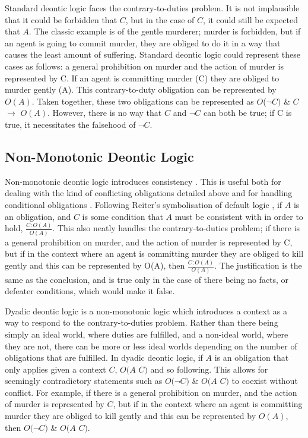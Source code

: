 \documentclass{l4proj}
\begin{document}
Standard deontic logic faces the contrary-to-duties problem. It is not implausible that it could be forbidden that $C$, but in the case of $C$, it could still be expected that $A$. The classic example is of the gentle murderer; murder is forbidden, but if an agent is going to commit murder, they are obliged to do it in a way that causes the least amount of suffering. Standard deontic logic could represent these cases as follows: a general prohibition on murder and the action of murder is represented by C. If an agent is committing murder (C) they are obliged to murder gently (A). This contrary-to-duty obligation can be represented by $O(A)$. Taken together, these two obligations can be represented as $O$(\( \neg \)$C)$ \& $C$ \( \to \) $O(A)$. However, there is no way that $C$ and \( \neg \)$C$ can both be true; if C is true, it necessitates the falsehood of $\neg C$. 

\subsection{Non-Monotonic Deontic Logic}
Non-monotonic deontic logic introduces consistency \cite{Powers}. This is useful both for dealing with the kind of conflicting obligations detailed above and for handling conditional obligations \cite{Horty}. Following Reiter's symbolisation of default logic \cite{Reiter}, if $A$ is an obligation, and $C$ is some condition that $A$ must be consistent with in order to hold, \( \frac{C : O(A)}{O(A)} \). This also neatly handles the contrary-to-duties problem; if there is a general prohibition on murder, and the action of murder is represented by C, but if in the context where an agent is committing murder they are obliged to kill gently and this can be represented by O(A), then \( \frac{C : O(A)}{O(A)} \). The justification is the same as the conclusion, and is true only in the case of there being no facts, or defeater conditions, which would make it false. 

Dyadic deontic logic is a non-monotonic logic which introduces a context as a way to respond to the contrary-to-duties problem. Rather than there being simply an ideal world, where duties are fulfilled, and a non-ideal world, where they are not, there can be more or less ideal worlds depending on the number of obligations that are fulfilled. In dyadic deontic logic, if $A$ is an obligation that only applies given a context $C$, $O(A$ \textbar $C)$ and so following. This allows for seemingly contradictory statements such as $O($\( \neg \)$C)$ \& $O(A$ \textbar $C)$ to coexist without conflict. For example, if there is a general prohibition on murder, and the action of murder is represented by $C$, but if in the context where an agent is committing murder they are obliged to kill gently and this can be represented by $O(A)$, then $O($\( \neg \)$C)$ \& $O(A$ \textbar $C)$. 
\end{document}
